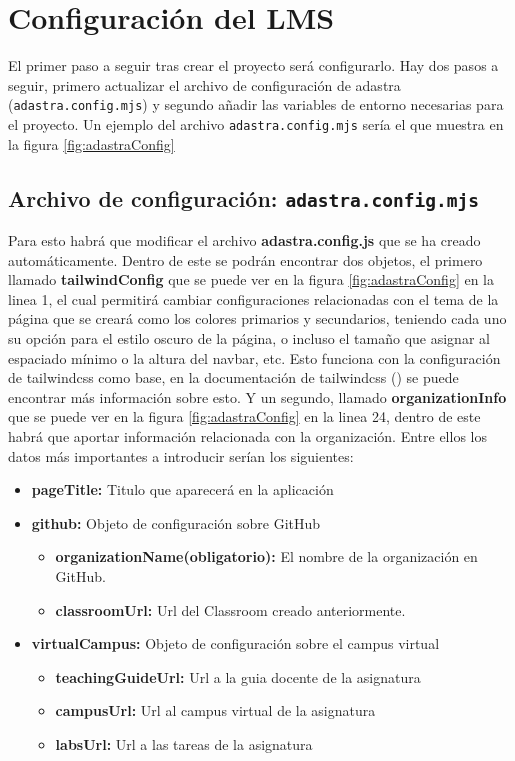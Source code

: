 \section{Configuración del LMS}
El primer paso a seguir tras crear el proyecto será configurarlo. Hay dos pasos a seguir, 
primero actualizar el archivo de configuración de adastra (\verb|adastra.config.mjs|) y segundo
añadir las variables de entorno necesarias para el proyecto. Un ejemplo del archivo \verb|adastra.config.mjs| sería el que muestra en la figura \ref{fig:adastraConfig}

\subsection{Archivo de configuración: {\tt adastra.config.mjs}}

 Para esto habrá que modificar el archivo \textbf{adastra.config.js} que se ha creado automáticamente. Dentro de este se podrán encontrar dos objetos, el primero llamado \textbf{tailwindConfig} que se puede ver en la figura \ref{fig:adastraConfig} en la linea 1, el cual permitirá cambiar configuraciones relacionadas con el tema de la página que se creará como los colores primarios y secundarios, teniendo cada uno su opción para el estilo oscuro de la página, o incluso el tamaño que asignar al espaciado mínimo o la altura del navbar, etc. Esto funciona con la configuración de tailwindcss como base, en la documentación de tailwindcss (\cite{tailwind-theme}) se puede encontrar más información sobre esto. Y un segundo, llamado \textbf{organizationInfo} que se puede ver en la figura \ref{fig:adastraConfig} en la linea 24, dentro de este habrá que aportar información relacionada con la organización. Entre ellos los datos más importantes a introducir serían los siguientes:

 \begin{itemize}
    \item \textbf{pageTitle:} Titulo que aparecerá en la aplicación
    \item \textbf{github:} Objeto de configuración sobre GitHub
        \begin{itemize}
            \item \textbf{organizationName(obligatorio):} El nombre de la organización en GitHub.
            \item \textbf{classroomUrl:} Url del Classroom creado anteriormente.
        \end{itemize}
    \item \textbf{virtualCampus:} Objeto de configuración sobre el campus virtual
        \begin{itemize}
            \item \textbf{teachingGuideUrl:} Url a la guia docente de la asignatura
            \item \textbf{campusUrl:} Url al campus virtual de la asignatura
            \item \textbf{labsUrl:} Url a las tareas de la asignatura
        \end{itemize}
\end{itemize}

